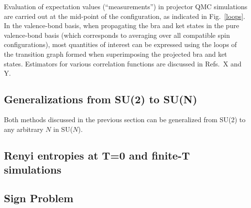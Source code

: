 \documentclass[range]{ar2e}
\begin{document}
Evaluation of expectation values (``measurements'') in projector QMC simulations are carried out at the mid-point of the configuration,
as indicated in Fig.~\ref{loops}. In the valence-bond basis, when propagating the bra and ket states in the pure valence-bond basis (which 
corresponds to averaging over all compatible spin configurations), most quantities of interest can be expressed using the loops of the
transition graph formed when superimposing the projected bra and ket states. Estimators for various correlation functions are discussed
in Refs.~X and Y.


\subsection {Generalizations from SU(2) to SU(N)}
\label{ss:su2N}

Both methods discussed in the previous section can be generalized from
SU($2$) to any arbitrary $N$ in SU($N$). 

\subsection{Renyi entropies at T=0 and finite-T simulations} \label{ss:renyi}

\subsection{Sign Problem}
\label{ss:sign}
\end{document}
